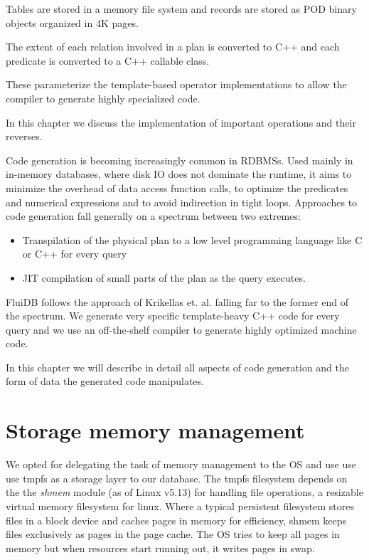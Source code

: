 
\begin{summary}
\item Tables are stored in a memory file system and records are
  stored as POD binary objects organized in 4K pages.
\item The extent of each relation involved in a plan is converted to
  C++  and each predicate is converted to a C++ callable
  class.
\item These parameterize the template-based operator implementations to allow the
  compiler to generate highly specialized code.
\item In this chapter we discuss the implementation of important
  operations and their reverses.
\end{summary}

Code generation is becoming increasingly common in RDBMSs. Used
mainly in in-memory databases, where disk IO does not dominate the
runtime, it aims to minimize the overhead of data access function
calls, to optimize the predicates and numerical expressions and to
avoid indirection in tight loops. Approaches to code generation fall
generally on a spectrum between two extremes:

\begin{itemize}
\item Transpilation of the physical plan to a low level programming
  language like C or C++ for every query
\item JIT compilation of small parts of the plan as the query
  executes.
\end{itemize}

FluiDB follows the approach of Krikellas
et. al. \cite{krikellasGeneratingCodeHolistic2010} falling far to the
former end of the spectrum. We generate very specific template-heavy
C++ code for every query and we use an off-the-shelf compiler to
generate highly optimized machine code.

In this chapter we will describe in detail all aspects of code generation and 
the form of data the generated code manipulates.

\section{Storage memory management}

We opted for delegating the task of memory management to the OS and use use use tmpfs
as a storage layer to our database. The tmpfs filesystem depends on
the the \emph{shmem} module (as of Linux v5.13) for handling file
operations, a resizable virtual memory filesystem for
linux. Where a typical persistent filesystem stores files in a block
device and caches pages in memory for efficiency, shmem keeps files
exclusively as pages in the page cache. The OS tries to keep all pages
in memory but when resources start running out, it writes pages in
swap.

